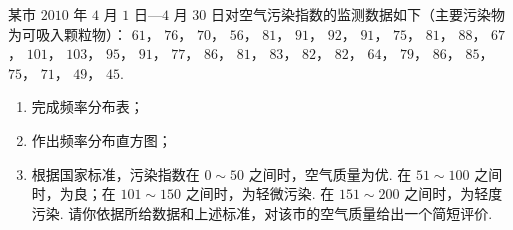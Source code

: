 \begin{problem}
某市 \(2010\) 年 \(4\) 月 \(1\) 日—\(4\) 月 \(30\) 日对空气污染指数的监测数据如下（主要污染物为可吸入颗粒物）： \(61\)， \(76\)， \(70\)， \(56\)， \(81\)， \(91\)， \(92\)， \(91\)， \(75\)， \(81\)， \(88\)， \(67\)， \(101\)， \(103\)， \(95\)， \(91\)， \(77\)， \(86\)， \(81\)， \(83\)， \(82\)， \(82\)， \(64\)， \(79\)， \(86\)， \(85\)， \(75\)， \(71\)， \(49\)， \(45\).

\begin{enumerate}
\item 完成频率分布表；
\item 作出频率分布直方图；
\item 根据国家标准，污染指数在 \(0\sim 50\) 之间时，空气质量为优. 在 \(51\sim 100\) 之间时，为良；在 \(101\sim 150\) 之间时，为轻微污染. 在 \(151\sim 200\) 之间时，为轻度污染. 请你依据所给数据和上述标准，对该市的空气质量给出一个简短评价.
\end{enumerate}

\end{problem}

